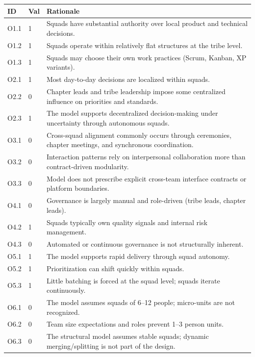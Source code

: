 \documentclass[11pt, a4paper, twocolumn]{article} %
\begin{document}
\begin{table}[h]
\centering
\begingroup\small
\setlength{\tabcolsep}{4pt}%
\begin{tabularx}{\linewidth}{llX}
\toprule
\textbf{ID} & \textbf{Val} & \textbf{Rationale} \\
\midrule
O1.1 & 1 &
Squads have substantial authority over local product and technical decisions. \\
O1.2 & 1 &
Squads operate within relatively flat structures at the tribe level. \\
O1.3 & 1 &
Squads may choose their own work practices (Scrum, Kanban, XP variants). \\
\midrule
O2.1 & 1 &
Most day-to-day decisions are localized within squads. \\
O2.2 & 0 &
Chapter leads and tribe leadership impose some centralized influence on priorities and standards. \\
O2.3 & 1 &
The model supports decentralized decision-making under uncertainty through autonomous squads. \\
\midrule
O3.1 & 0 &
Cross-squad alignment commonly occurs through ceremonies, chapter meetings, and synchronous coordination. \\
O3.2 & 0 &
Interaction patterns rely on interpersonal collaboration more than contract-driven modularity. \\
O3.3 & 0 &
Model does not prescribe explicit cross-team interface contracts or platform boundaries. \\
\midrule
O4.1 & 0 &
Governance is largely manual and role-driven (tribe leads, chapter leads). \\
O4.2 & 1 &
Squads typically own quality signals and internal risk management. \\
O4.3 & 0 &
Automated or continuous governance is not structurally inherent. \\
\midrule
O5.1 & 1 &
The model supports rapid delivery through squad autonomy. \\
O5.2 & 1 &
Prioritization can shift quickly within squads. \\
O5.3 & 1 &
Little batching is forced at the squad level; squads iterate continuously. \\
\midrule
O6.1 & 0 &
The model assumes squads of 6--12 people; micro-units are not recognized. \\
O6.2 & 0 &
Team size expectations and roles prevent 1--3 person units. \\
O6.3 & 0 &
The structural model assumes stable squads; dynamic merging/splitting is not part of the design. \\
\bottomrule
\end{tabularx}
\endgroup
\end{table}
\end{document}
